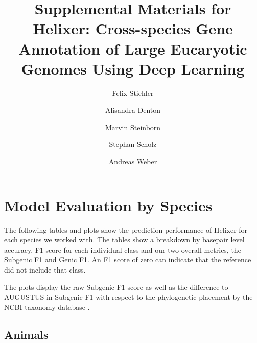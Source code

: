 \documentclass{article}
\begin{document}
\title{Supplemental Materials for \\ Helixer: Cross-species Gene Annotation of Large Eucaryotic Genomes Using Deep Learning}

\author[1]{Felix Stiehler}
\author[1]{Alisandra Denton}
\author[1]{Marvin Steinborn}
\author[ \hspace{-1ex}]{Stephan Scholz}
\author[1]{Andreas Weber}


\date{}
\maketitle
\tableofcontents

\newpage
\section{Model Evaluation by Species}
The following tables and plots show the prediction performance of Helixer for each species we worked with. The tables show a breakdown by basepair level accuracy, F1 score for each individual class and our two overall metrics, the Subgenic F1 and Genic F1. An F1 score of zero can indicate that the reference did not include that class. 

The plots display the raw Subgenic F1 score as well as the difference to AUGUSTUS in Subgenic F1 with respect to the phylogenetic placement by the NCBI taxonomy database \citep{federhen2012ncbi}.

\subsection{Animals}
\newpage
\end{document}
